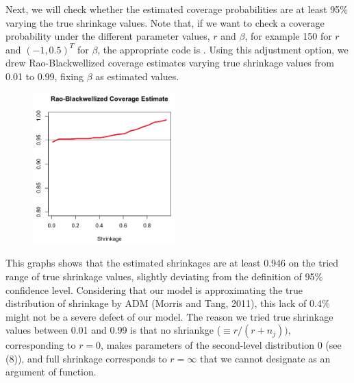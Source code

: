 \documentclass[article]{jss}
\begin{document}
Next, we will check whether the estimated coverage probabilities are at least 95\% varying the true shrinkage values. Note that, if we want to check a coverage probability under the different parameter values, $r$ and $\beta$, for example 150 for $r$ and $(-1, 0.5)^{T}$ for $\beta$, the appropriate code is . Using this adjustment option, we drew Rao-Blackwellized coverage estimates varying true shrinkage values from 0.01 to 0.99, fixing $\beta$ as estimated values.
\begin{CodeChunk}
\end{CodeChunk}
\begin{figure}[h]
\begin{center}
\includegraphics[width = 5.5cm]{baseball4.png}
\end{center}
\end{figure}

This graphs shows that the estimated shrinkages are at least 0.946 on the tried range of true shrinkage values, slightly deviating from the definition of 95\% confidence level. Considering that our model is approximating the true distribution of shrinkage by ADM (Morris and Tang, 2011), this lack of 0.4\% might not be a severe defect of our model. The reason we tried true shrinkage values between 0.01 and 0.99 is that no shriankge ($\equiv r / (r + n_{j}))$, corresponding to $r=0$, makes parameters of the second-level distribution 0 (see (8)), and full shrinkage corresponds to $r=\infty$ that we cannot designate as an argument of  function.
\\
\end{document}
